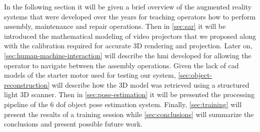 In the following section it will be given a brief overview of the augmented reality systems that were developed over the years for teaching operators how to perform assembly, maintenance and repair operations. Then in \cref{sec:sar} it will be introduced the mathematical modeling of video projectors that we proposed along with the calibration required for accurate 3D rendering and projection. Later on, \cref{sec:human-machine-interaction} will describe the \gls{hmi} developed for allowing the operator to navigate between the assembly operations. Given the lack of \gls{cad} models of the starter motor used for testing our system, \cref{sec:object-reconstruction} will describe how the 3D model was retrieved using a structured light 3D scanner. Then in \cref{sec:pose-estimation} it will be presented the processing pipeline of the 6 \gls{dof} object pose estimation system. Finally, \cref{sec:training} will present the results of a training session while \cref{sec:conclusions} will summarize the conclusions and present possible future work.
